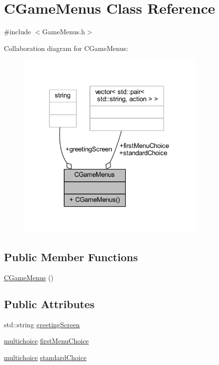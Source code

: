 \hypertarget{class_c_game_menus}{}\section{C\+Game\+Menus Class Reference}
\label{class_c_game_menus}


{\ttfamily \#include $<$Game\+Menus.\+h$>$}



Collaboration diagram for C\+Game\+Menus\+:\nopagebreak
\begin{figure}[H]
\begin{center}
\leavevmode
\includegraphics[width=264pt]{class_c_game_menus__coll__graph}
\end{center}
\end{figure}
\subsection*{Public Member Functions}
\begin{DoxyCompactItemize}
\item 
\mbox{\hyperlink{class_c_game_menus_ae891c5e1fbae7982987b2e9c282229fe}{C\+Game\+Menus}} ()
\end{DoxyCompactItemize}
\subsection*{Public Attributes}
\begin{DoxyCompactItemize}
\item 
std\+::string \mbox{\hyperlink{class_c_game_menus_ab492143bf00abf8c3989d156bca41559}{greeting\+Screen}}
\item 
\mbox{\hyperlink{_game_menus_8h_acdb545ed67596d0840e35ed209fecbe9}{multichoice}} \mbox{\hyperlink{class_c_game_menus_a5c9a8f8ab4c9ebf6181d2eacafde1cf3}{first\+Menu\+Choice}}
\item 
\mbox{\hyperlink{_game_menus_8h_acdb545ed67596d0840e35ed209fecbe9}{multichoice}} \mbox{\hyperlink{class_c_game_menus_aba28b1bba7ded84e947d1a132258dc82}{standard\+Choice}}
\end{DoxyCompactItemize}


